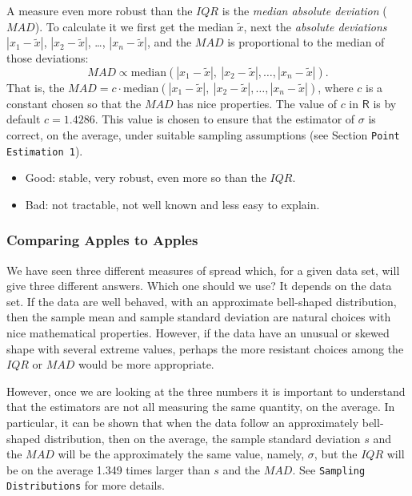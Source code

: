 \documentclass[10pt,english]{scrbook}
\begin{document}
A measure even more robust than the \(IQR\) is the \emph{median absolute deviation} (\(MAD\)). To calculate it we first get the median \(\widetilde{x}\), next the \emph{absolute deviations} \(|x_{1}-\tilde{x}|\), \(|x_{2}-\tilde{x}|\), \ldots{}, \(|x_{n}-\tilde{x}|\), and the \(MAD\) is proportional to the median of those deviations:
\begin{equation}
MAD\propto\mbox{median}(|x_{1}-\tilde{x}|,\ |x_{2}-\tilde{x}|,\ldots,|x_{n}-\tilde{x}|).
\end{equation}
That is, the \(MAD=c\cdot\mbox{median}(|x_{1}-\tilde{x}|,\ |x_{2}-\tilde{x}|,\ldots,|x_{n}-\tilde{x}|)\), where \(c\) is a constant chosen so that the \(MAD\) has nice properties. The value of \(c\) in \(\mathsf{R}\) is by default \(c=1.4286\). This value is chosen to ensure that the estimator of \(\sigma\) is correct, on the average, under suitable sampling assumptions (see Section \texttt{Point Estimation 1}).
\begin{itemize}
\item Good: stable, very robust, even more so than the \(IQR\).
\item Bad: not tractable, not well known and less easy to explain.
\end{itemize}
\subsubsection[Comparing Apples to Apples]{Comparing Apples to Apples}
\label{sec-1-3-4-4}

We have seen three different measures of spread which, for a given data set, will give three different answers. Which one should we use? It depends on the data set. If the data are well behaved, with an approximate bell-shaped distribution, then the sample mean and sample standard deviation are natural choices with nice mathematical properties. However, if the data have an unusual or skewed shape with several extreme values, perhaps the more resistant choices among the \(IQR\) or \(MAD\) would be more appropriate.

However, once we are looking at the three numbers it is important to understand that the estimators are not all measuring the same quantity, on the average. In particular, it can be shown that when the data follow an approximately bell-shaped distribution, then on the average, the sample standard deviation \(s\) and the \(MAD\) will be the approximately the same value, namely, \(\sigma\), but the \(IQR\) will be on the average 1.349 times larger than \(s\) and the \(MAD\). See \texttt{Sampling Distributions} for more details.
\end{document}
